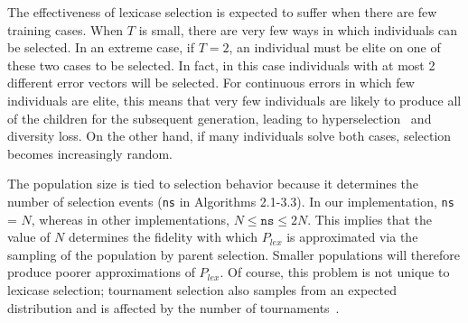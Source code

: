 \documentclass[twoside]{article}
\begin{document}
The effectiveness of lexicase selection is expected to suffer when there are few training cases. When $T$ is small, there are very few ways in which individuals can be selected. In an extreme case, if $T = 2$, an individual must be elite on one of these two cases to be selected. In fact, in this case individuals with at most 2 different error vectors will be selected. For continuous errors in which few individuals are elite, this means that very few individuals are likely to produce all of the children for the subsequent generation, leading to hyperselection~\citep{helmuth_impact_2016} and diversity loss. On the other hand, if many individuals solve both cases, selection becomes increasingly random. 

The population size is tied to selection behavior because it determines the number of selection events (\texttt{ns} in Algorithms 2.1-3.3). In our implementation, \texttt{ns} = $N$, whereas in other implementations, $N \leq \texttt{ns} \leq 2N$. This implies that the value of $N$ determines the fidelity with which $P_{lex}$ is approximated via the sampling of the population by parent selection. Smaller populations will therefore produce poorer approximations of $P_{lex}$. Of course, this problem is not unique to lexicase selection; tournament selection also samples from an expected distribution and is affected by the number of tournaments~\citep{xie_another_2007}.  
\end{document}
